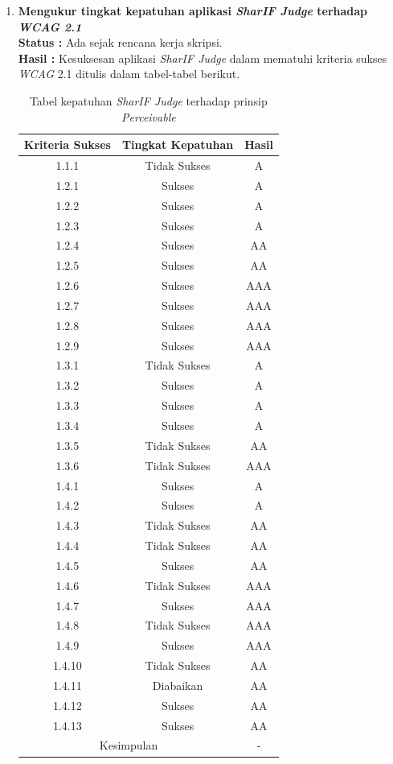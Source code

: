 \documentclass[a4paper,twoside]{article}
\begin{document}
\begin{enumerate}
		
		\item \textbf{Mengukur tingkat kepatuhan aplikasi \textit{SharIF Judge} terhadap \textit{WCAG 2.1}}\\
		{\bf Status :} Ada sejak rencana kerja skripsi.\\
		{\bf Hasil :} Kesuksesan aplikasi \textit{SharIF Judge} dalam mematuhi kriteria sukses \textit{WCAG} 2.1 ditulis dalam tabel-tabel berikut.
		
		\begin{table}[H]
			\centering
			\caption{Tabel kepatuhan \textit{SharIF Judge} terhadap prinsip \textit{Perceivable}}
			\label{tab:kepatuhan_sharif_judge_perceivable}
			\begin{tabular}{|c|c|c|}
				\hline
				Kriteria Sukses & Tingkat Kepatuhan & Hasil \\
				\hline
				1.1.1 & Tidak Sukses & A\\
				1.2.1 & Sukses & A\\
				1.2.2 & Sukses & A\\
				1.2.3 & Sukses & A\\
				1.2.4 & Sukses & AA\\
				1.2.5 & Sukses & AA\\
				1.2.6 & Sukses & AAA\\
				1.2.7 & Sukses & AAA\\
				1.2.8 & Sukses & AAA\\
				1.2.9 & Sukses & AAA\\
				1.3.1 & Tidak Sukses & A\\
				1.3.2 & Sukses & A\\
				1.3.3 & Sukses & A\\
				1.3.4 & Sukses & A\\
				1.3.5 & Tidak Sukses & AA \\
				1.3.6 & Tidak Sukses & AAA \\
				1.4.1 & Sukses & A\\
				1.4.2 & Sukses & A\\
				1.4.3 & Tidak Sukses & AA\\
				1.4.4 & Tidak Sukses & AA\\
				1.4.5 & Sukses & AA\\
				1.4.6 & Tidak Sukses & AAA\\
				1.4.7 & Sukses & AAA\\
				1.4.8 & Tidak Sukses & AAA\\
				1.4.9 & Sukses & AAA\\
				1.4.10 & Tidak Sukses & AA \\
				1.4.11 & Diabaikan & AA \\
				1.4.12 & Sukses & AA\\
				1.4.13 & Sukses & AA\\
				\hline
				\multicolumn{2}{|c|}{Kesimpulan} & - \\
				\hline
			\end{tabular}
		\end{table}
		

\end{enumerate}
\end{document}
